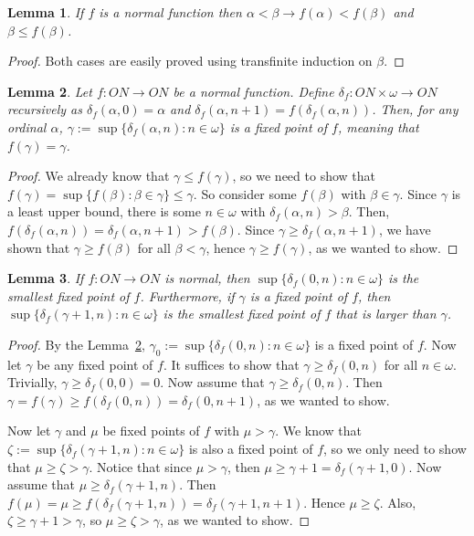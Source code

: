 \documentclass{report}
\newtheorem{lemma}{Lemma}[section]
\theoremstyle{definition}
\theoremstyle{remark}
\newcommand{\set}[1]{\{#1\}}
\newcommand{\limplies}{\rightarrow}
\begin{document}
\begin{lemma}
    If $f$ is a normal function then $\alpha < \beta \limplies f(\alpha) < f(\beta)$ and $\beta \leq f(\beta)$.
\end{lemma}

\begin{proof}
    Both cases are easily proved using transfinite induction on $\beta$.
\end{proof}

\begin{lemma} \label{lemma:normal_fixed_point}
    Let $f : ON \to ON$ be a normal function. Define $\delta_f : ON \times \omega \to ON$ recursively as $\delta_f(\alpha, 0) = \alpha$ and $\delta_f(\alpha, n+1) = f(\delta_f(\alpha, n))$. Then, for any ordinal $\alpha$, $\gamma := \sup\set{\delta_f(\alpha, n) : n \in \omega}$ is a fixed point of $f$, meaning that $f (\gamma) = \gamma$.
\end{lemma}

\begin{proof}
    We already know that $\gamma \leq f(\gamma)$, so we need to show that $f(\gamma) = \sup\set{f(\beta) : \beta \in \gamma} \leq \gamma$. So consider some $f(\beta)$ with $\beta \in \gamma$. Since $\gamma$ is a least upper bound, there is some $n \in \omega$ with $\delta_f(\alpha, n) > \beta$. Then, $f(\delta_f(\alpha, n)) = \delta_f(\alpha, n+1) > f(\beta)$. Since $\gamma \geq \delta_f(\alpha, n+1)$, we have shown that $\gamma \geq f(\beta)$ for all $\beta < \gamma$, hence $\gamma \geq f(\gamma)$, as we wanted to show.
\end{proof}

\begin{lemma} \label{lemma:next_fixed_point}
    If $f : ON \to ON$ is normal, then $\sup\set{\delta_f(0, n) : n \in \omega}$ is the smallest fixed point of $f$. Furthermore, if $\gamma$ is a fixed point of $f$, then $\sup\set{\delta_f(\gamma+1, n) : n \in \omega}$ is the smallest fixed point of $f$ that is larger than $\gamma$.
\end{lemma}

\begin{proof}
    By the Lemma~\ref{lemma:normal_fixed_point}, $\gamma_0 := \sup\set{\delta_f(0, n) : n \in \omega}$ is a fixed point of $f$. Now let $\gamma$ be any fixed point of $f$. It suffices to show that $\gamma \geq \delta_f(0, n)$ for all $n \in \omega$. Trivially, $\gamma \geq \delta_f(0, 0) = 0$. Now assume that $\gamma \geq \delta_f(0, n)$. Then $\gamma = f(\gamma) \geq f(\delta_f(0, n)) = \delta_f(0, n+1)$, as we wanted to show.
    
    Now let $\gamma$ and $\mu$ be fixed points of $f$ with $\mu > \gamma$. We know that $\zeta := \sup\set{\delta_f(\gamma+1, n) : n \in \omega}$ is also a fixed point of $f$, so we only need to show that $\mu \geq \zeta > \gamma$. Notice that since $\mu > \gamma$, then $\mu \geq \gamma+1 = \delta_f(\gamma+1, 0)$. Now assume that $\mu \geq \delta_f(\gamma+1, n)$. Then $f(\mu) = \mu \geq f(\delta_f(\gamma+1, n)) = \delta_f(\gamma+1, n+1)$. Hence $\mu \geq \zeta$. Also, $\zeta \geq \gamma + 1 > \gamma$, so $\mu \geq \zeta > \gamma$, as we wanted to show.
\end{proof}
\end{document}
